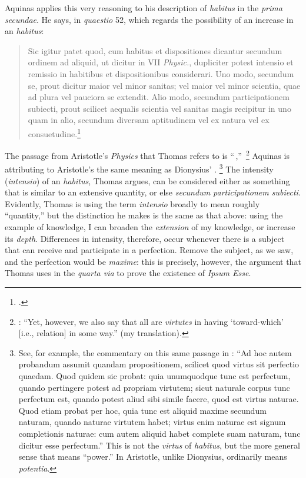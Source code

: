 Aquinas applies this very reasoning to his description of \emph{habitus} in the \emph{prima secundae}. He says, in \emph{quaestio} 52, which regards the possibility of an increase in an \emph{habitus}:
%
\begin{quotation}
Sic igitur patet quod, cum habitus et dispositiones dicantur secundum ordinem ad aliquid, ut dicitur in VII \emph{Physic.}, dupliciter potest intensio et remissio in habitibus et dispositionibus considerari. Uno modo, secundum se, prout dicitur maior vel minor sanitas; vel maior vel minor scientia, quae ad plura vel pauciora se extendit. Alio modo, secundum participationem subiecti, prout scilicet aequalis scientia vel sanitas magis recipitur in uno quam in alio, secundum diversam aptitudinem vel ex natura vel ex consuetudine.\footcite[I-II, q.~53, a.~1, co.]{st:summa}
\end{quotation}
%
The passage from Aristotle's \emph{Physics} that Thomas refers to is ``\,,''\,%
%
\footnote{\Cite[, 3, 246b 3-4]{aristotle:physics}: ``Yet, however, we also say that all are \emph{virtutes} in having `toward-which' [i.e., relation] in some way.'' (my translation).} Aquinas is attributing to Aristotle's  the same meaning as Dionysius' .%
%
\footnote{See, for example, the commentary on this same passage in \cite[VII, lc.~6, 920]{st:phys}: ``Ad hoc autem probandum assumit quandam propositionem, scilicet quod virtus sit perfectio quaedam. Quod quidem sic probat: quia unumquodque tunc est perfectum, quando pertingere potest ad propriam virtutem; sicut naturale corpus tunc perfectum est, quando potest aliud sibi simile facere, quod est virtus naturae. Quod etiam probat per hoc, quia tunc est aliquid maxime secundum naturam, quando naturae virtutem habet; virtus enim naturae est signum completionis naturae: cum autem aliquid habet complete suam naturam, tunc dicitur esse perfectum.''
This is not the \emph{virtus} of \emph{habitus}, but the more general sense that means ``power.''  In Aristotle, unlike Dionysius,  ordinarily means \emph{potentia}.}
%
The intensity (\emph{intensio})  of an \emph{habitus}, Thomas argues, can be considered either as something that is similar to an extensive quantity, or else \emph{secundum participationem subiecti}. Evidently, Thomas is using the term \emph{intensio} broadly to mean roughly ``quantity,'' but the distinction he makes is the same as that above: using the example of knowledge, I can broaden the \emph{extension} of my knowledge, or increase its \emph{depth}. Differences in intensity, therefore, occur whenever there is a subject that can receive and participate in a perfection. Remove the subject, as we saw, and the perfection would be \emph{maxime}: this is precisely, however, the argument that Thomas uses in the \emph{quarta via} to prove the existence of \emph{Ipsum Esse}.

